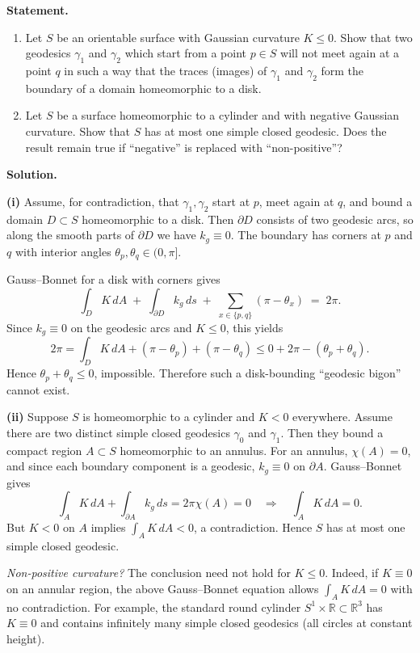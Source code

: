 \documentclass[12pt,a4paper]{article}
\theoremstyle{plain}
\theoremstyle{definition}      %
\begin{document}
	\textbf{Statement.}
	\begin{enumerate}
		\item Let $S$ be an orientable surface with Gaussian curvature $K\le 0$.
		Show that two geodesics $\gamma_1$ and $\gamma_2$ which start from a point $p\in S$ will not meet again at a point $q$
		in such a way that the traces (images) of $\gamma_1$ and $\gamma_2$ form the boundary of a domain homeomorphic to a disk.
		\item Let $S$ be a surface homeomorphic to a cylinder and with negative Gaussian curvature.
		Show that $S$ has at most one simple closed geodesic.
		Does the result remain true if ``negative'' is replaced with ``non-positive''?
	\end{enumerate}
	
	\textbf{Solution.}
	
	\textbf{(i)} Assume, for contradiction, that $\gamma_1,\gamma_2$ start at $p$, meet again at $q$, and bound a domain $D\subset S$
	homeomorphic to a disk. Then $\partial D$ consists of two geodesic arcs, so along the smooth parts of $\partial D$ we have
	$k_g\equiv 0$. The boundary has corners at $p$ and $q$ with interior angles $\theta_p,\theta_q\in(0,\pi]$.
	
	Gauss--Bonnet for a disk with corners gives
	\[
	\int_D K\,dA \;+\; \int_{\partial D} k_g\,ds \;+\; \sum_{x\in\{p,q\}}(\pi-\theta_x) \;=\; 2\pi.
	\]
	Since $k_g\equiv 0$ on the geodesic arcs and $K\le 0$, this yields
	\[
	2\pi
	= \int_D K\,dA + (\pi-\theta_p)+(\pi-\theta_q)
	\le 0 + 2\pi - (\theta_p+\theta_q).
	\]
	Hence $\theta_p+\theta_q\le 0$, impossible.
	Therefore such a disk-bounding “geodesic bigon” cannot exist.
	
	\medskip
	
	\textbf{(ii)} Suppose $S$ is homeomorphic to a cylinder and $K<0$ everywhere.
	Assume there are two distinct simple closed geodesics $\gamma_0$ and $\gamma_1$.
	Then they bound a compact region $A\subset S$ homeomorphic to an annulus.
	For an annulus, $\chi(A)=0$, and since each boundary component is a geodesic, $k_g\equiv 0$ on $\partial A$.
	Gauss--Bonnet gives
	\[
	\int_A K\,dA + \int_{\partial A} k_g\,ds = 2\pi\chi(A)=0
	\quad\Longrightarrow\quad
	\int_A K\,dA = 0.
	\]
	But $K<0$ on $A$ implies $\int_A K\,dA<0$, a contradiction.
	Hence $S$ has at most one simple closed geodesic.
	
	\medskip
	
	\textit{Non-positive curvature?}
	The conclusion need not hold for $K\le 0$.
	Indeed, if $K\equiv 0$ on an annular region, the above Gauss--Bonnet equation allows $\int_A K\,dA=0$ with no contradiction.
	For example, the standard round cylinder $S^1\times\mathbb{R}\subset\mathbb{R}^3$ has $K\equiv 0$ and contains infinitely many
	simple closed geodesics (all circles at constant height).
	
\end{document}
